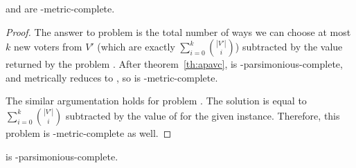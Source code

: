 \begin{theorem} \label{th:acavd}
	 and  are \sharpPclass-me\-tric-complete.
\end{theorem}

\begin{proof}
The answer to problem  is the total number of ways we can choose at most $k$ new voters from $V'$ (which are exactly $\sum_{i=0}^k\binom{|V'|}{i}$) subtracted by the value returned by the problem .
After theorem~\ref{th:apavc},  is \sharpPclass-parsimonious-complete, and  metrically reduces to , so  is \sharpPclass-metric-complete.

The similar argumentation holds for problem .
The solution is equal to $\sum_{i=0}^k\binom{|V'|}{i}$ subtracted by the value of  for the given instance.
Therefore, this problem is \sharpPclass-metric-complete as well.
\end{proof}

\begin{theorem} \label{th:apdvc}
	 is \sharpPclass-parsimonious-complete.
\end{theorem}

